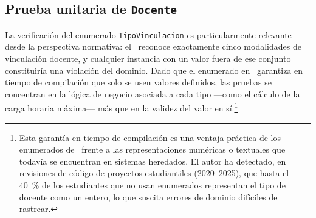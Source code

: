 \subsection{Prueba unitaria de \texttt{Docente}}
\label{subsec:prueba-docente}

La verificación del enumerado \texttt{TipoVinculacion} es particularmente relevante desde
la perspectiva normativa: el \acuerdo\ reconoce exactamente cinco modalidades de vinculación
docente, y cualquier instancia con un valor fuera de ese conjunto constituiría una violación
del dominio. Dado que el enumerado en \java\ garantiza en tiempo de compilación que solo
se usen valores definidos, las pruebas se concentran en la lógica de negocio asociada
a cada tipo ---como el cálculo de la carga horaria máxima--- más que en la validez del valor
en sí.\footnote{Esta garantía en tiempo de compilación es una ventaja práctica de los
enumerados de \java\ frente a las representaciones numéricas o textuales que todavía
se encuentran en sistemas heredados. El autor ha detectado, en revisiones de código de
proyectos estudiantiles (2020--2025), que hasta el 40~\% de los estudiantes que no usan
enumerados representan el tipo de docente como un entero, lo que suscita errores de
dominio difíciles de rastrear.}

